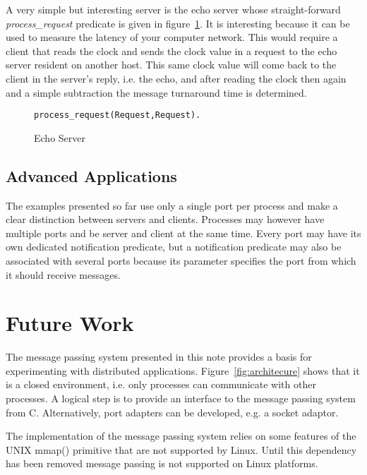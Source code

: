 A very simple but interesting server is the echo server whose straight-forward
{\it process\_request} predicate is given in figure~\ref{fig:server_echo}. It
is interesting because it can be used to measure the latency of your
computer network. This would require a client that reads the clock and
sends the clock value in a request to the echo server resident on another 
host. This same clock value will come back to the client in the server's reply,
i.e. the echo, and after reading the clock then again and a simple subtraction 
the message turnaround time is determined. 

\begin{figure}[hbt]
\begin{verbatim}
process_request(Request,Request).
\end{verbatim}
\caption{\label{fig:server_echo} {Echo Server}}
\end{figure} 

\subsection{Advanced Applications}

The examples presented so far use only a single port per process and
make a clear distinction between servers and clients. Processes may
however have multiple ports and be server and client at the same time.
Every port may have its own dedicated notification predicate, but a
notification predicate may also be associated with several ports because
its parameter specifies the port from which it should receive messages.



\section{Future Work}
\label{sec:future}

The message passing system presented in this note provides a basis
for experimenting with distributed \eclipse applications. 
Figure~\ref{fig:architecure} shows that it is a closed environment,
i.e. only \eclipse processes can communicate with other \eclipse
processes. A logical step is to provide an interface to the message
passing system from C. Alternatively, port adapters can be developed,
e.g. a socket adaptor.

The implementation of the \eclipse message passing system relies
on some features of the UNIX mmap() primitive that are not supported
by Linux. Until this dependency has been removed \eclipse message
passing is not supported on Linux platforms.

